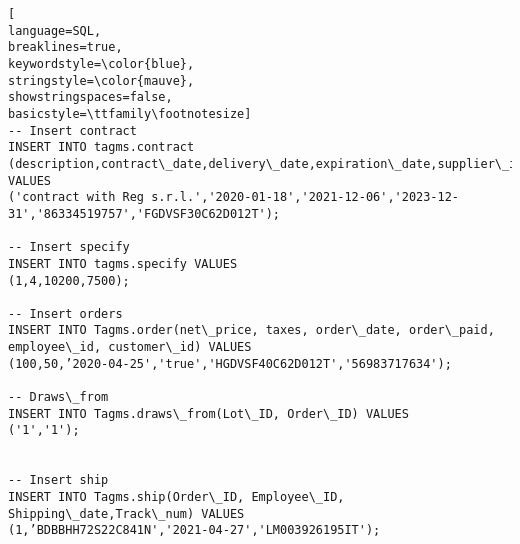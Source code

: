 \begin{lstlisting}[
language=SQL,
breaklines=true,
keywordstyle=\color{blue},
stringstyle=\color{mauve},
showstringspaces=false,
basicstyle=\ttfamily\footnotesize]
-- Insert contract
INSERT INTO tagms.contract (description,contract\_date,delivery\_date,expiration\_date,supplier\_id,employee\_id) VALUES
('contract with Reg s.r.l.','2020-01-18','2021-12-06','2023-12-31','86334519757','FGDVSF30C62D012T');

-- Insert specify
INSERT INTO tagms.specify VALUES
(1,4,10200,7500);

-- Insert orders
INSERT INTO Tagms.order(net\_price, taxes, order\_date, order\_paid, employee\_id, customer\_id) VALUES
(100,50,’2020-04-25','true','HGDVSF40C62D012T','56983717634');

-- Draws\_from
INSERT INTO Tagms.draws\_from(Lot\_ID, Order\_ID) VALUES
('1','1');


-- Insert ship
INSERT INTO Tagms.ship(Order\_ID, Employee\_ID, Shipping\_date,Track\_num) VALUES
(1,’BDBBHH72S22C841N','2021-04-27','LM003926195IT');

\end{lstlisting}